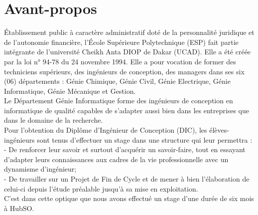 %
%
%
%
%
%
\chapter*{Avant-propos}
\begin{SingleSpace}

Établissement public à caractère administratif doté de la personnalité juridique et de l’autonomie financière, l’École Supérieure Polytechnique (ESP) fait partie intégrante de l’université Cheikh Anta DIOP de Dakar (UCAD). Elle a été créée par la loi n° 94-78 du 24 novembre 1994. Elle a pour vocation de former des techniciens supérieurs, des ingénieurs de conception, des managers dans ses six (06) départements : Génie Chimique, Génie Civil, Génie Electrique, Génie Informatique, Génie Mécanique et Gestion.\\
Le Département Génie Informatique forme des ingénieurs de conception en informatique de qualité capables de s’adapter aussi bien dans les entreprises que dans le domaine de la recherche.\\
Pour l’obtention du Diplôme d’Ingénieur de Conception (DIC), les élèves-ingénieurs sont tenus d’effectuer un stage dans une structure qui leur permettra : \\
- De renforcer leur savoir et surtout d’acquérir un savoir-faire, tout en essayant d’adapter leurs connaissances aux cadres de la vie professionnelle avec un dynamisme d’ingénieur;\\
- De travailler sur un Projet de Fin de Cycle et de mener à bien l’élaboration de celui-ci depuis l’étude préalable jusqu'à sa mise en exploitation.\\
C’est dans cette optique que nous avons effectué un stage d'une durée de six mois à HubSO.

\end{SingleSpace}
